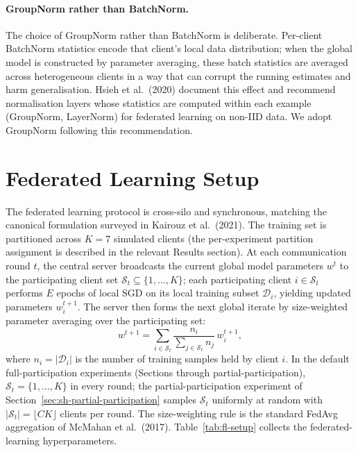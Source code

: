 \documentclass[11pt,a4paper]{report}
\begin{document}
\paragraph{GroupNorm rather than BatchNorm.}
The choice of GroupNorm rather than BatchNorm is deliberate.
Per-client BatchNorm statistics encode that client's local data
distribution; when the global model is constructed by parameter
averaging, these batch statistics are averaged across heterogeneous
clients in a way that can corrupt the running estimates and harm
generalisation. Hsieh et al.\ (2020) document this effect and
recommend normalisation layers whose statistics are computed
within each example (GroupNorm, LayerNorm) for federated learning
on non-IID data. We adopt GroupNorm following this recommendation.

\section{Federated Learning Setup}
\label{sec:methods-fl-setup}

The federated learning protocol is cross-silo and synchronous,
matching the canonical formulation surveyed in Kairouz et al.\
(2021). The training set is partitioned across $K = 7$ simulated
clients (the per-experiment partition assignment is described
in the relevant Results section). At each communication round
$t$, the central server broadcasts the current global model
parameters $w^t$ to the participating client set
$\mathcal{S}_t \subseteq \{1, \dots, K\}$; each participating
client $i \in \mathcal{S}_t$ performs $E$ epochs of local SGD on
its local training subset $\mathcal{D}_i$, yielding updated
parameters $w_i^{t+1}$. The server then forms the next global
iterate by size-weighted parameter averaging over the
participating set:
\[
w^{t+1} = \sum_{i \in \mathcal{S}_t}
\frac{n_i}{\sum_{j \in \mathcal{S}_t} n_j}\, w_i^{t+1},
\]
where $n_i = |\mathcal{D}_i|$ is the number of training samples
held by client $i$. In the default full-participation
experiments (Sections through partial-participation),
$\mathcal{S}_t = \{1, \dots, K\}$ in every round; the
partial-participation experiment of
Section~\ref{sec:sh-partial-participation} samples $\mathcal{S}_t$
uniformly at random with $|\mathcal{S}_t| = \lfloor C K \rfloor$
clients per round. The size-weighting rule is the standard
FedAvg aggregation of McMahan et al.\ (2017).
Table~\ref{tab:fl-setup} collects the federated-learning
hyperparameters.
\end{document}
